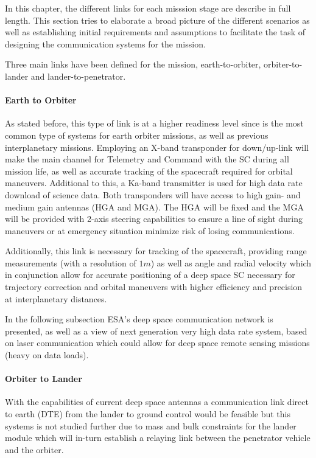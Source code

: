 
In this chapter, the different links for each misssion stage are describe in full length. This section tries to elaborate a broad picture of the different scenarios as well as establishing initial requirements and assumptions to facilitate the task of designing the communication systems for the mission.

Three main links have been defined for the mission, earth-to-orbiter, orbiter-to-lander and lander-to-penetrator.

\paragraph{Earth to Orbiter}
As stated before, this type of link is at a higher readiness level since is the most common type of systems for earth orbiter missions, as well as previous interplanetary missions. Employing an X-band transponder for down/up-link will make the main channel for Telemetry and Command with the SC during all mission life, as well as accurate tracking of the spacecraft required for orbital maneuvers. Additional to this, a Ka-band transmitter is used for high data rate download of science data. Both transponders will have access to high gain- and medium gain antennas (HGA and MGA). The HGA will be fixed and the MGA will be provided with 2-axis steering capabilities to ensure a line of sight during maneuvers or at emergency situation minimize risk of losing communications.

Additionally, this link is necessary for tracking of the spacecraft, providing range measurements (with a resolution of $1m$) as well as angle and radial velocity which in conjunction allow for accurate positioning of a deep space SC necessary for trajectory correction and orbital maneuvers with higher efficiency and precision at interplanetary distances.

In the following subsection ESA's deep space communication network is presented, as well as a view of next generation very high data rate system, based on laser communication which could allow for deep space remote sensing missions (heavy on data loads).

\paragraph{Orbiter to Lander}
With the capabilities of current deep space antennas a communication link direct to earth (DTE) from the lander to ground control would be feasible but this systems is not studied further due to mass and bulk constraints for the lander module which will in-turn establish a relaying link between the penetrator vehicle and the orbiter. 

